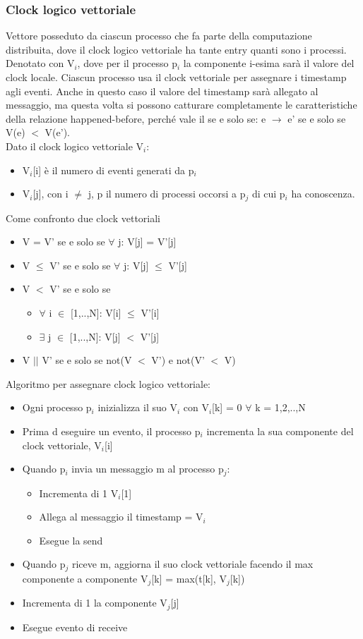\documentclass{article}
\begin{document}
\subsubsection{Clock logico vettoriale}
Vettore posseduto da ciascun processo che fa parte della computazione distribuita, dove il clock logico vettoriale ha tante entry quanti sono i processi. Denotato con V$_i$, dove per il processo p$_i$ la componente i-esima sarà il valore del clock locale. Ciascun processo usa il clock vettoriale per assegnare i timestamp agli eventi. Anche in questo caso il valore del timestamp sarà allegato al messaggio, ma questa volta si possono catturare completamente le caratteristiche della relazione happened-before, perché vale il se e solo se: e $\rightarrow$ e' se e solo se V(e) $<$ V(e').\\ Dato il clock logico vettoriale V$_i$:
\begin{itemize}
\item V$_i$[i] è il numero di eventi generati da p$_i$
\item V$_i$[j], con i $\neq$ j, p il numero di processi occorsi a p$_j$ di cui p$_i$ ha conoscenza.
\end{itemize}
Come confronto due clock vettoriali
\begin{itemize}
\item V = V' se e solo se $\forall$ j: V[j] = V'[j]
\item V $\leq$ V' se e solo se $\forall$ j: V[j] $\leq$ V'[j]
\item V $<$ V' se e solo se
\begin{itemize}
\item $\forall$ i $\in$ [1,..,N]: V[i] $\leq$ V'[i]
\item $\exists$ j $\in$ [1,..,N]: V[j] $<$ V'[j]
\end{itemize}
\item V $||$ V' se e solo se not(V $<$ V') e not(V' $<$ V) 
\end{itemize}
Algoritmo per assegnare clock logico vettoriale:
\begin{itemize}
\item Ogni processo p$_i$ inizializza il suo  V$_i$ con  V$_i$[k] = 0 $\forall$ k = 1,2,..,N
\item Prima d eseguire un evento, il processo  p$_i$ incrementa la sua componente del clock vettoriale,  V$_i$[i]
\item Quando  p$_i$ invia un messaggio m al processo  p$_j$:
\begin{itemize}
\item Incrementa di 1 V$_i$[1]
\item Allega al messaggio il timestamp =  V$_i$
\item Esegue la send
\end{itemize}
\item Quando  p$_j$ riceve m, aggiorna il suo clock vettoriale  facendo il max componente a componente  V$_j$[k] = max(t[k],  V$_j$[k])
\item Incrementa di 1 la componente  V$_j$[j]
\item Esegue evento di receive
\end{itemize}
\end{document}
